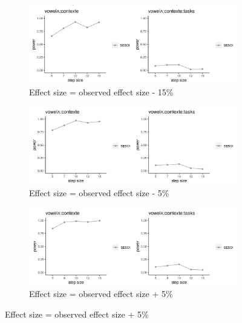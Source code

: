 \documentclass[12 pt]{article}
\begin{document}
\begin{figure}[!htb] \label{figure_power_analysis_f2}
	\centering
	\begin{subfigure}[t]{0.8\textwidth}
		\centering
		\includegraphics[width=\textwidth]{powerplot_f2_minus15} 
		\caption{Effect size = observed effect size - 15\%} \label{f2_minus15}
	\end{subfigure}
	
	\begin{subfigure}[t]{0.8\textwidth}
		\centering
		\includegraphics[width=\textwidth]{powerplot_f2_minus5} 
		\caption{Effect size = observed effect size - 5\%} \label{f2_minus5}
	\end{subfigure}
	
	
	\begin{subfigure}[t]{0.8\textwidth}
		\centering
		\includegraphics[width=\textwidth]{powerplot_f2_plus5} 
		\caption{Effect size = observed effect size + 5\%} \label{f2_plus5}
	\end{subfigure}
	

\end{figure}
\end{document}
